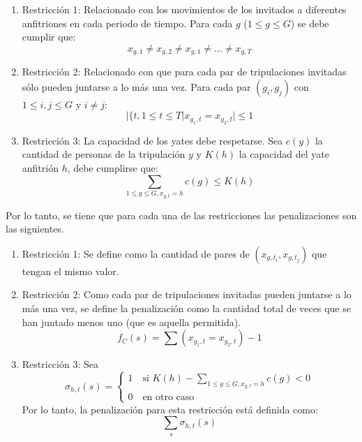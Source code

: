 \documentclass[letter, 10pt]{article}
\begin{document}
\begin{enumerate}
    \item Restricción 1: Relacionado con los movimientos de los invitados a diferentes anfitriones en cada periodo de tiempo. Para cada $g$ ($1\leq g \leq G$) se debe cumplir que:
    \begin{equation}
        x_{g,1}\neq x_{g,2}\neq x_{g,1}\neq ... \neq x_{g,T}
    \end{equation}
    \item Restricción 2: Relacionado con que para cada par de tripulaciones invitadas sólo pueden juntarse a lo más una vez. Para cada par $(g_i, g_j)$ con $1\leq i,j \leq G$ y $i\neq j$:
    \begin{equation}
        |\{t,1\leq t \leq T | x_{g_1,t}=x_{g_2,t}| \leq 1
    \end{equation}
    \item Restricción 3: La capacidad de los yates debe respetarse. Sea $c(y)$ la cantidad de personas de la tripulación $y$ y $K(h)$ la capacidad del yate anfitrión $h$, debe cumplirse que:
    \begin{equation}
        \sum_{1\leq g \leq G, x_{g,t}=h} c(g)\leq K(h)
    \end{equation}
\end{enumerate}

Por lo tanto, se tiene que para cada una de las restricciones las penalizaciones son las siguientes.

\begin{enumerate}
    \item Restricción 1: Se define como la cantidad de pares de $(x_{g,t_i}, x_{g,t_j})$ que tengan el mismo valor.
    \item Restricción 2: Como cada par de tripulaciones invitadas pueden juntarse a lo más una vez, se define la penalización como la cantidad total de veces que se han juntado menos uno (que es aquella permitida).
    \begin{equation}
        f_C(s)=\sum (x_{g_1,t}=x_{g_2,t}) - 1
    \end{equation}
    \item Restricción 3: Sea 
    \begin{equation}
        \sigma_{h,t}(s)= \begin{cases} 1 \quad \text{si $K(h)-\sum_{1\leq g \leq G, x_{g,t}=h} c(g) <0$} \\ 0 \quad \text{en otro caso} \end{cases}
    \end{equation}
    Por lo tanto, la penalización para esta restricción está definida como:
    \begin{equation}
        \sum_{s} \sigma_{h,t}(s)
    \end{equation}
\end{enumerate}
\end{document}
